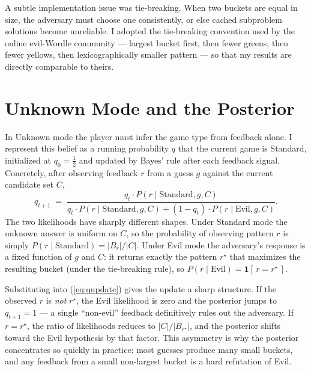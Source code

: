 \documentclass[11pt]{article}
\begin{document}
A subtle implementation issue was tie-breaking. When two buckets are
equal in size, the adversary must choose one consistently, or else
cached subproblem solutions become unreliable. I adopted the
tie-breaking convention used by the online evil-Wordle community ---
largest bucket first, then fewer greens, then fewer yellows, then
lexicographically smaller pattern --- so that my results are directly
comparable to theirs.

\section*{Unknown Mode and the Posterior}

In Unknown mode the player must infer the game type from feedback
alone. I represent this belief as a running probability $q$ that the
current game is Standard, initialized at $q_0 = \tfrac12$ and updated
by Bayes' rule after each feedback signal. Concretely, after
observing feedback $r$ from a guess $g$ against the current candidate
set $C$,
\begin{equation}
  q_{t+1}
  \;=\;
  \frac{q_t \cdot P(r \mid \text{Standard}, g, C)}
       {q_t \cdot P(r \mid \text{Standard}, g, C)
        + (1{-}q_t) \cdot P(r \mid \text{Evil}, g, C)}.
  \label{eq:qupdate}
\end{equation}
The two likelihoods have sharply different shapes. Under Standard
mode the unknown answer is uniform on $C$, so the probability of
observing pattern $r$ is simply $P(r \mid \text{Standard}) = |B_r|/|C|$.
Under Evil mode the adversary's response is a fixed function of $g$
and $C$: it returns exactly the pattern $r^\star$ that maximizes the
resulting bucket (under the tie-breaking rule), so
$P(r \mid \text{Evil}) = \mathbf{1}[\,r = r^\star\,]$.

Substituting into (\ref{eq:qupdate}) gives the update a sharp
structure. If the observed $r$ is \emph{not} $r^\star$, the Evil
likelihood is zero and the posterior jumps to $q_{t+1} = 1$ --- a
single ``non-evil'' feedback definitively rules out the adversary. If
$r = r^\star$, the ratio of likelihoods reduces to $|C|/|B_{r^\star}|$,
and the posterior shifts toward the Evil hypothesis by that factor.
This asymmetry is why the posterior concentrates so quickly in
practice: most guesses produce many small buckets, and any feedback
from a small non-largest bucket is a hard refutation of Evil.
\end{document}
